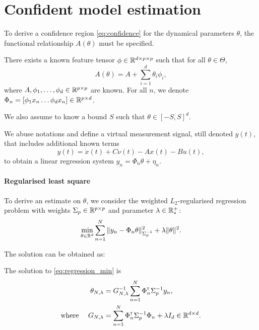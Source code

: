\section{Confident model estimation}


\label{sec:estimation}

To derive a confidence region \eqref{eq:confidence} for the dynamical parameters $\theta$, the functional relationship $A(\theta)$ must be specified.
\begin{assumption}[Structure]
	\label{assumpt:structure}
	\begin{leftbar}[assumptionbar]
	There exists a known feature tensor $\phi\in \mathbb{R}^{d \times p \times p}$ such that for all $\theta\in\Theta$,
	\begin{equation}
	A(\theta) = A + %
	\sum_{i=1}^d \theta_i\phi_i,
	\end{equation}
	where $A,\phi_1,\dots,\phi_d\in\mathbb{R}^{p\times p}$ are known. For all $n$, we denote $\Phi_n = [\phi_1 x_n \dots \phi_d x_n]\in\mathbb{R}^{p\times d}$.
	
	We also assume to know a bound $S$ such that $\theta\in[-S,S]^d$.
	\end{leftbar}
\end{assumption}

We abuse notations and define a virtual measurement signal, still denoted $y(t)$, that includes additional known terms
\begin{equation*}
y(t) = \dot{x}(t) + C\nu(t) - A x(t) - Bu(t),
\end{equation*}
to obtain a linear regression system
$
y_n = \Phi_n\theta + \eta_n.
$

\paragraph{Regularised least square} To derive an estimate on $\theta$, we consider the weighted $L_2$-regularised regression problem with weights  $\Sigma_p\in\mathbb{R}^{p\times p}$ and parameter $\lambda\in\mathbb{R}^+_*$:
\begin{equation}
\label{eq:regression_min}
\min_{\theta\in\mathbb{R}^d} \sum_{n=1}^N \|y_n -\Phi_n\theta\|_{\Sigma_p^{-1}}^2 + \lambda\|\theta\|_{}^2.
\end{equation}


The solution can be obtained as:

\begin{proposition}
	\label{prop:regularized_solution}
	\begin{leftbar}[propositionbar]
	The solution to \eqref{eq:regression_min} is
	\begin{align}
	\label{eq:vector_rls}
	\theta_{N,\lambda} &= G_{N, \lambda}^{-1} \sum_{n=1}^N \Phi_n^{\mathsf{\scriptscriptstyle T}} \Sigma_p^{-1} y_n,\\
	\label{eq:g_n_lambda}
	\text{where }\quad G_{N, \lambda} &= \sum_{n=1}^N \Phi_{n}^{\mathsf{\scriptscriptstyle T}}\Sigma_p^{-1}\Phi_{n}  + \lambda I_d \in \mathbb{R}^{d\times d}.
	\end{align}
	\end{leftbar}
\end{proposition}

